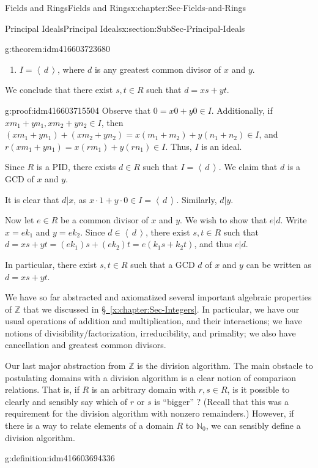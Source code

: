 \documentclass[oneside,10pt,]{book}
\numberwithin{equation}{section}
\newcommand{\ideal}[1]{\left\langle\, #1 \,\right\rangle}
\def\Z{{\mathbb Z}}
\def\N{{\mathbb N}}
\begin{document}
\begin{chapterptx}{Fields and Rings}{}{Fields and Rings}{}{}{x:chapter:Sec-Fields-and-Rings}
\begin{sectionptx}{Principal Ideals}{}{Principal Ideals}{}{}{x:section:SubSec-Principal-Ideals}
\begin{theorem}{}{}{g:theorem:idm416603723680}
\begin{enumerate}
\item{}\(I = \ideal{d}\), where \(d\) is any greatest common divisor of \(x\) and \(y\).%
\end{enumerate}
%
\par
We conclude that there exist \(s,t\in R\) such that \(d = xs + yt\).%
\end{theorem}
\begin{proofptx}{}{g:proof:idm416603715504}
Observe that \(0 = x0 + y0 \in I\). Additionally, if \(x m_1 + y n_1, x m_2 + y n_2\in I\), then \((x m_1 + y n_1) + (x m_2 + y n_2) = x (m_1 + m_2) + y (n_1 + n_2) \in I\), and \(r(x m_1 + y n_1) = x (rm_1) + y(rn_1) \in I\). Thus, \(I\) is an ideal.%
\par
Since \(R\) is a PID, there exists \(d\in R\) such that \(I = \ideal{d}\). We claim that \(d\) is a GCD of \(x\) and \(y\).%
\par
It is clear that \(d|x\), as \(x\cdot 1 + y\cdot 0\in I = \ideal{d}\). Similarly, \(d|y\).%
\par
Now let \(e\in R\) be a common divisor of \(x\) and \(y\). We wish to show that \(e|d\). Write \(x = e k_1\) and \(y = e k_2\). Since \(d\in \ideal{d}\), there exist \(s,t\in R\) such that \(d = x s + yt = (e k_1) s + (e k_2)t = e(k_1 s + k_2 t)\), and thus \(e|d\).%
\par
In particular, there exist \(s,t\in R\) such that a GCD \(d\) of \(x\) and \(y\) can be written as \(d = xs + yt\).%
\end{proofptx}
We have so far abstracted and axiomatized several important algebraic properties of \(\Z\) that we discussed in \hyperref[x:chapter:Sec-Integers]{§~\ref{x:chapter:Sec-Integers}}. In particular, we have our usual operations of addition and multiplication, and their interactions; we have notions of divisibility\slash{}factorization, irreducibility, and primality; we also have cancellation and greatest common divisors.%
\par
Our last major abstraction from \(\Z\) is the division algorithm. The main obstacle to postulating domains with a division algorithm is a clear notion of comparison relations. That is, if \(R\) is an arbitrary domain with \(r,s\in R\), is it possible to clearly and sensibly say which of \(r\) or \(s\) is ``bigger'' ? (Recall that this was a requirement for the division algorithm with nonzero remainders.) However, if there is a way to relate elements of a domain \(R\) to \(\N_0\), we can sensibly define a division algorithm.%
\begin{definition}{}{g:definition:idm416603694336}%

\end{definition}
\end{sectionptx}
\end{chapterptx}
\end{document}
